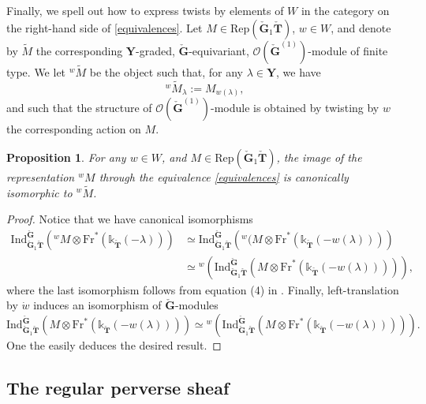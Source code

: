 \documentclass[11pt]{amsart}
\theoremstyle{plain}
\newtheorem{prop}[thm]{Proposition}
\theoremstyle{remark}
\numberwithin{equation}{section}
\begin{document}
Finally, we spell out how to express twists by elements of $W$ in the category on the right-hand side of \eqref{equivalences}. Let $M\in\mathrm{Rep}(\check{\mathbf{G}}_1\check{\mathbf{T}})$, $w\in W$, and denote by $\widetilde{M}$ the corresponding $\mathbf{Y}$-graded, $\check{\mathbf{G}}$-equivariant, $\mathcal{O}(\check{\mathbf{G}}^{(1)})$-module of finite type. We let $^w\widetilde{M}$ be the object such that, for any $\lambda\in\mathbf{Y}$, we have
$$^w\widetilde{M}_\lambda:=M_{w(\lambda)}, $$
and such that the structure of $\mathcal{O}(\check{\mathbf{G}}^{(1)})$-module is obtained by twisting by $w$ the corresponding action on $M$.
\begin{prop}\label{prop twist coh}
    For any $w\in W$, and $M\in\mathrm{Rep}(\check{\mathbf{G}}_1\check{\mathbf{T}})$, the image of the representation $^wM$ through the equivalence \eqref{equivalences} is canonically isomorphic to $^w\widetilde{M}$.
\end{prop}
\begin{proof}
    Notice that we have canonical isomorphisms
    \begin{align*}
        \mathrm{Ind}_{\check{\mathbf{G}}_1\check{\mathbf{T}}}^{\check{\mathbf{G}}}\left({^wM}\otimes\mathrm{Fr}^*(\mathbb{k}_{\check{\mathbf{T}}}(-\lambda))\right)&\simeq \mathrm{Ind}_{\check{\mathbf{G}}_1\check{\mathbf{T}}}^{\check{\mathbf{G}}}\left({^w(M\otimes\mathrm{Fr}^*(\mathbb{k}_{\check{\mathbf{T}}}(-w(\lambda)))}\right)\\
        &\simeq {^w\left(\mathrm{Ind}_{\check{\mathbf{G}}_1\check{\mathbf{T}}}^{\check{\mathbf{G}}}\left(M\otimes\mathrm{Fr}^*(\mathbb{k}_{\check{\mathbf{T}}}(-w(\lambda)))\right)\right)},
    \end{align*}
    where the last isomorphism follows from equation (4) in \cite[§I.3.5]{jantzen2003representations}. Finally, left-translation by $\dot{w}$ induces an isomorphism of $\check{\mathbf{G}}$-modules
    $$\mathrm{Ind}_{\check{\mathbf{G}}_1\check{\mathbf{T}}}^{\check{\mathbf{G}}}\left(M\otimes\mathrm{Fr}^*(\mathbb{k}_{\check{\mathbf{T}}}(-w(\lambda)))\right)\simeq {^w\left(\mathrm{Ind}_{\check{\mathbf{G}}_1\check{\mathbf{T}}}^{\check{\mathbf{G}}}\left(M\otimes\mathrm{Fr}^*(\mathbb{k}_{\check{\mathbf{T}}}(-w(\lambda)))\right)\right)}. $$
    One the easily deduces the desired result.
\end{proof}
 
	\subsection{The regular perverse sheaf}\label{section The regular perverse sheaf}
	
\end{document}
